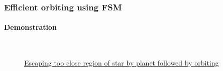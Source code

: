 \begin{frame}
\frametitle{Efficient orbiting using FSM}
\framesubtitle{Demonstration}
\begin{figure}[H]
	\begin{center}
	\\
	\vspace{0.4cm}
	\caption{\href{https://youtu.be/X6dGCLT0ho8}{Escaping too close region of star by planet followed by orbiting}}
	\label{fig:shape_formation_demo}
	\end{center}
\end{figure}
\end{frame}